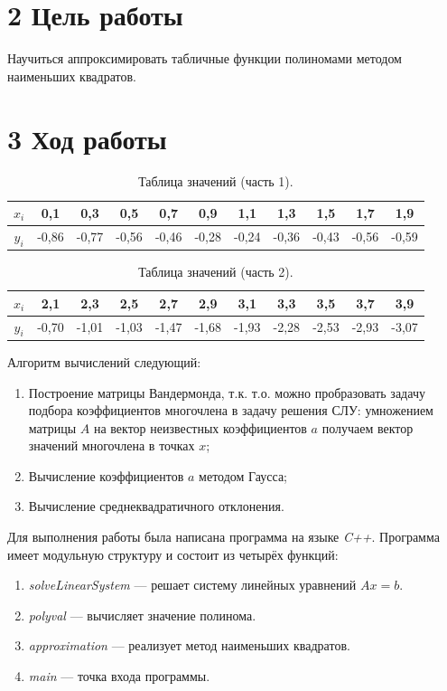 \documentclass[14pt,a4paper]{extarticle}
\begin{document}
	\section*{2 Цель работы}
	Научиться аппроксимировать табличные функции полиномами методом наименьших квадратов.
	
	\section*{3 Ход работы}
	
	\begin{table}[h]
		\centering
		\caption{Таблица значений (часть 1).}
		\begin{tabular}{|c|c|c|c|c|c|c|c|c|c|c|}
			\hline
			$x_i$ & 0,1 & 0,3 & 0,5 & 0,7 & 0,9 & 1,1 & 1,3 & 1,5 & 1,7 & 1,9 \\ \hline
			$y_i$ & -0,86 & -0,77 & -0,56 & -0,46 & -0,28 & -0,24 & -0,36 & -0,43 & -0,56 & -0,59 \\ \hline
		\end{tabular}
	\end{table}
	
	\begin{table}[h]
		\centering
		\caption{Таблица значений (часть 2).}
		\begin{tabular}{|c|c|c|c|c|c|c|c|c|c|c|}
			\hline
			$x_i$ & 2,1 & 2,3 & 2,5 & 2,7 & 2,9 & 3,1 & 3,3 & 3,5 & 3,7 & 3,9 \\ \hline
			$y_i$ & -0,70 & -1,01 & -1,03 & -1,47 & -1,68 & -1,93 & -2,28 & -2,53 & -2,93 & -3,07 \\ \hline
		\end{tabular}
	\end{table}
	
	Алгоритм вычислений следующий:
	\begin{enumerate}
		\item Построение матрицы Вандермонда, т.к. т.о. можно пробразовать задачу подбора коэффициентов многочлена в задачу решения СЛУ: умножением матрицы $A$ на вектор неизвестных коэффициентов $a$ получаем вектор значений многочлена в точках $x$;
		\item Вычисление коэффициентов $a$ методом Гаусса;
		\item Вычисление среднеквадратичного отклонения.
	\end{enumerate}
	
	Для выполнения работы была написана программа на языке \textit{C++}. Программа имеет модульную структуру и состоит из четырёх функций:
	\begin{enumerate}
		\item \textit{solveLinearSystem} — решает систему линейных уравнений $Ax=b$.
		\item \textit{polyval} — вычисляет значение полинома.
		\item \textit{approximation} — реализует метод наименьших квадратов.
		\item \textit{main} — точка входа программы.
	\end{enumerate}
	
\end{document}
